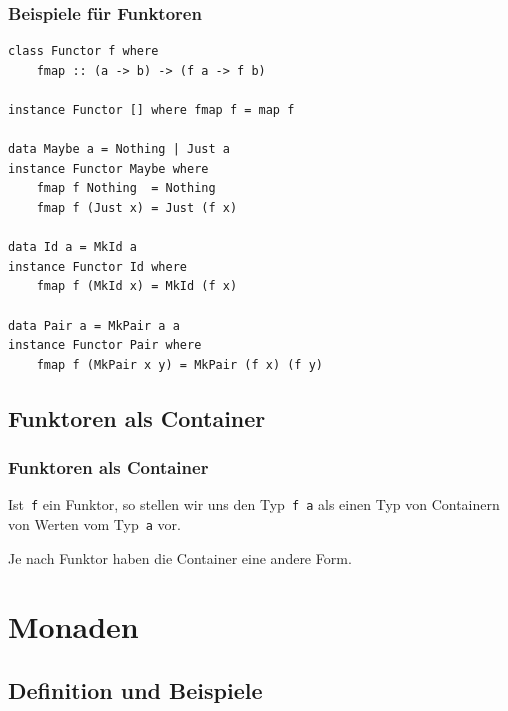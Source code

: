 \documentclass[12pt,compress,ngerman,utf8,t]{beamer}
\begin{document}
\begin{frame}[fragile]\frametitle{Beispiele für Funktoren}
  \vspace*{-1em}
  \small
  \begin{verbatim}
class Functor f where
    fmap :: (a -> b) -> (f a -> f b)

instance Functor [] where fmap f = map f

data Maybe a = Nothing | Just a
instance Functor Maybe where
    fmap f Nothing  = Nothing
    fmap f (Just x) = Just (f x)

data Id a = MkId a
instance Functor Id where
    fmap f (MkId x) = MkId (f x)

data Pair a = MkPair a a
instance Functor Pair where
    fmap f (MkPair x y) = MkPair (f x) (f y)
  \end{verbatim}
\end{frame}


\subsection{Funktoren als Container}

\begin{frame}[fragile]\frametitle{Funktoren als Container}
  Ist~\texttt{f} ein Funktor, so stellen wir uns den
  Typ~\texttt{f a} als einen Typ von Containern von Werten vom
  Typ~\texttt{a} vor.
  \medskip

  Je nach Funktor haben die Container eine andere Form.
\end{frame}



\section{Monaden}

\subsection{Definition und Beispiele}
\end{document}

